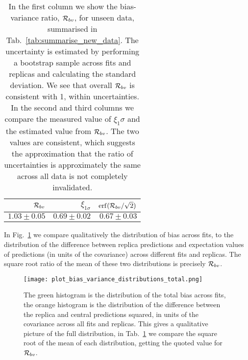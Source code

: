 \begin{table}[h]
    \begin{center}
        \setlength{\tabcolsep}{12pt} 
        \begin{tabular}{rrr}
            \toprule
             $\mathcal{R}_{bv}$ & $\xi_{1\sigma}$ & ${\rm erf}(\mathcal{R}_{bv}/\sqrt{2})$ \\
            \midrule
             $1.03\pm0.05$ & $0.69\pm0.02$   & $0.67\pm0.03$                  \\
            \bottomrule
            \end{tabular}
    \end{center}
    \caption{In the first column we show the bias-variance ratio,
        $\mathcal{R}_{bv}$, for unseen data, summarised in
        Tab.~\ref{tab:summarise_new_data}. The uncertainty is estimated by
        performing a bootstrap sample across fits and replicas and calculating
        the standard deviation. We see that overall $\mathcal{R}_{bv}$ is
        consistent with 1, within uncertainties. In the second and third
        columns we compare the measured value of $\xi_1\sigma$ and the estimated
        value from $\mathcal{R}_{bv}$. The two values are consistent, which
        suggests the approximation that the ratio of uncertainties is
        approximately the same across all data is not completely invalidated.}
    \label{tab:biasvarratio}
\end{table}

In Fig.~\ref{eq:bias_varinace_distributions} we compare qualitatively the
distribution of bias across fits, to the distribution of the difference between
replica predictions and expectation values of predictions (in units of the
covariance) across different fits and replicas. The square root ratio of the
mean of these two distributions is precisely $\mathcal{R}_{bv}$.

\begin{figure}[h]
    \centering
    \texttt{[image: plot\_bias\_variance\_distributions\_total.png]}
    \caption{The green histogram is the distribution of the total bias across
    fits, the orange histogram is the distribution of the difference between the
    replica and central predictions squared, in units of the covariance across
    all fits and replicas. This gives a qualitative picture of the full
    distribution, in Tab.~\ref{tab:biasvarratio} we compare the square root of
    the mean of each distribution, getting the quoted value for
    $\mathcal{R}_{bv}$.}
    \label{eq:bias_varinace_distributions}
\end{figure}

